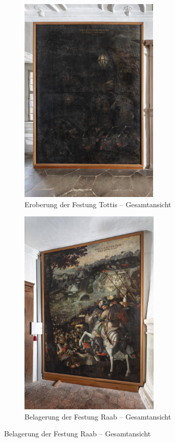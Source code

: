 \documentclass[
  a4paper,
]{book}
\begin{document}
\begin{figure}
\begin{figure}[H]    
  \includegraphics[height=10cm]{images/fmd10005851a.jpg}
  \caption{Eroberung der Festung Tottis – Gesamtansicht}
  \label{fig:{images/fmd10005851a.jpg}}
\end{figure}

\clearpage

\begin{figure}[H]    
  \includegraphics[height=10cm]{images/fmd10005843a.jpg}
  \caption{Belagerung der Festung Raab – Gesamtansicht}
  \label{fig:{images/fmd10005843a.jpg}}
\end{figure}

\clearpage


\end{figure}
\end{document}
